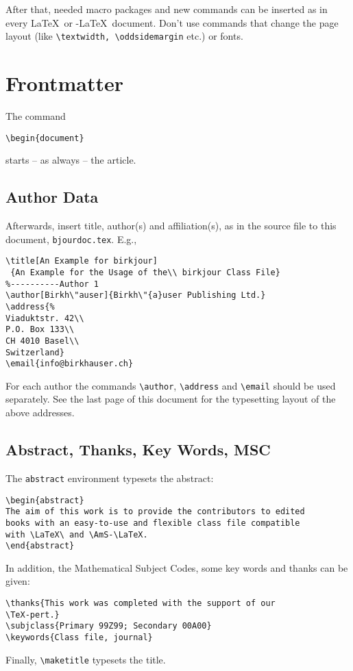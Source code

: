 \documentclass{birkjour}
\theoremstyle{definition}
\theoremstyle{remark}
\numberwithin{equation}{section}
\begin{document}
After that, needed macro packages and new commands can be inserted
as in every \LaTeX\ or \AmS-\LaTeX\ document. Don't use commands
that change the page layout (like
\verb+\textwidth, \oddsidemargin+
etc.) or fonts.\bigskip

\section{Frontmatter}
The command
\begin{verbatim}\begin{document}\end{verbatim}
starts -- as always -- the article.

\subsection{Author Data}

Afterwards, insert title, author(s) and affiliation(s), as in the source file to this document,
\verb+bjourdoc.tex+. E.g.,
\begin{verbatim}
\title[An Example for birkjour]
 {An Example for the Usage of the\\ birkjour Class File}
%----------Author 1
\author[Birkh\"auser]{Birkh\"{a}user Publishing Ltd.}
\address{%
Viaduktstr. 42\\
P.O. Box 133\\
CH 4010 Basel\\
Switzerland}
\email{info@birkhauser.ch}
\end{verbatim}
For each author the commands \verb+\author+, \verb+\address+ and \verb+\email+ should be used separately. See the last page of this document for the typesetting layout of the above addresses.

\subsection{Abstract, Thanks, Key Words, MSC}

The \verb+abstract+ environment typesets the abstract:
\begin{verbatim}
\begin{abstract}
The aim of this work is to provide the contributors to edited
books with an easy-to-use and flexible class file compatible
with \LaTeX\ and \AmS-\LaTeX.
\end{abstract}
\end{verbatim}
In addition, the Mathematical Subject Codes, some key words and thanks can be given:
\begin{verbatim}
\thanks{This work was completed with the support of our
\TeX-pert.}
\subjclass{Primary 99Z99; Secondary 00A00}
\keywords{Class file, journal}
\end{verbatim}
Finally, \verb+\maketitle+ typesets the title.
\end{document}

